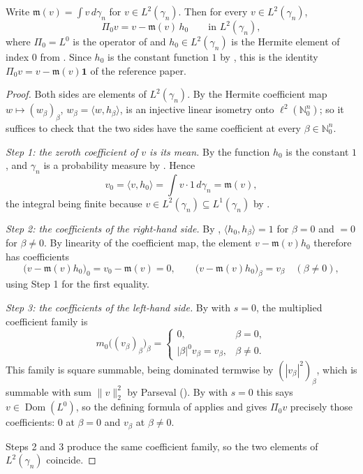 \begin{lemma}
Write $\mathfrak{m}(v) = \int v \, d\gamma_n$ for $v \in L^2(\gamma_n)$.  Then for
every $v \in L^2(\gamma_n)$,
\[
  \Pi_0 v = v - \mathfrak{m}(v)\, h_0
  \qquad\text{in } L^2(\gamma_n),
\]
where $\Pi_0 = L^0$ is the operator of  and $h_0 \in L^2(\gamma_n)$
is the Hermite element of index $0$ from .  Since $h_0$ is the
constant function $1$ by , this is the identity
$\Pi_0 v = v - \mathfrak{m}(v)\mathbf{1}$ of the reference paper.
\end{lemma}
\begin{proof}
Both sides are elements of $L^2(\gamma_n)$.  By  the Hermite
coefficient map $w \mapsto (w_\beta)_\beta$, $w_\beta = \langle w, h_\beta\rangle$,
is an injective linear isometry onto $\ell^2(\mathbb{N}_0^n)$; so it suffices to
check that the two sides have the same coefficient at every
$\beta \in \mathbb{N}_0^n$.

\emph{Step 1: the zeroth coefficient of $v$ is its mean.}
By  the function $h_0$ is the constant $1$, and
$\gamma_n$ is a probability measure by .  Hence
\[
  v_0 = \langle v, h_0\rangle = \int v \cdot 1 \, d\gamma_n = \mathfrak{m}(v),
\]
the integral being finite because $v \in L^2(\gamma_n) \subseteq L^1(\gamma_n)$ by
.

\emph{Step 2: the coefficients of the right-hand side.}
By , $\langle h_0, h_\beta\rangle = 1$ for
$\beta = 0$ and $= 0$ for $\beta \neq 0$.  By linearity of the coefficient map,
the element $v - \mathfrak{m}(v) h_0$ therefore has coefficients
\[
  \bigl(v - \mathfrak{m}(v)h_0\bigr)_0 = v_0 - \mathfrak{m}(v) = 0,
  \qquad
  \bigl(v - \mathfrak{m}(v)h_0\bigr)_\beta = v_\beta \quad (\beta \neq 0),
\]
using Step 1 for the first equality.

\emph{Step 3: the coefficients of the left-hand side.}
By  with $s = 0$, the multiplied coefficient family is
\[
  m_0\bigl((v_\beta)_\beta\bigr)_\beta
    = \begin{cases} 0, & \beta = 0,\\ |\beta|^0 v_\beta = v_\beta, & \beta \neq 0.\end{cases}
\]
This family is square summable, being dominated termwise by $(|v_\beta|^2)_\beta$,
which is summable with sum $\|v\|_2^2$ by Parseval ().  By
 with $s = 0$ this says $v \in \operatorname{Dom}(L^0)$, so
the defining formula of  applies and gives $\Pi_0 v$ precisely
those coefficients: $0$ at $\beta = 0$ and $v_\beta$ at $\beta \neq 0$.

Steps 2 and 3 produce the same coefficient family, so the two elements of
$L^2(\gamma_n)$ coincide.
\end{proof}
